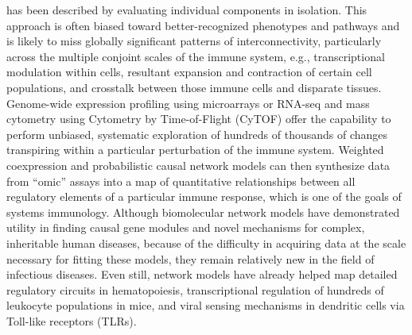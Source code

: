  has been described by evaluating individual components in isolation. This approach is often biased toward better-recognized phenotypes and pathways and is likely to miss globally significant patterns of interconnectivity, particularly across the multiple conjoint scales of the immune system, e.g., transcriptional modulation within cells, resultant expansion and contraction of certain cell populations, and crosstalk between those immune cells and disparate tissues.\autocite{Kidd2014} Genome-wide expression profiling using microarrays or RNA-seq and mass cytometry using Cytometry by Time-of-Flight (CyTOF) offer the capability to perform unbiased, systematic exploration of hundreds of thousands of changes transpiring within a particular perturbation of the immune system. Weighted coexpression and probabilistic causal network models can then synthesize data from “omic” assays into a map of quantitative relationships between all regulatory elements of a particular immune response, which is one of the goals of systems immunology. Although biomolecular network models have demonstrated utility in finding causal gene modules and novel mechanisms for complex, inheritable human diseases, because of the difficulty in acquiring data at the scale necessary for fitting these models, they remain relatively new in the field of infectious diseases. Even still, network models have already helped map detailed regulatory circuits in hematopoiesis, transcriptional regulation of hundreds of leukocyte populations in mice, and viral sensing mechanisms in dendritic cells via Toll-like receptors (TLRs).\autocite{Kidd2014}

